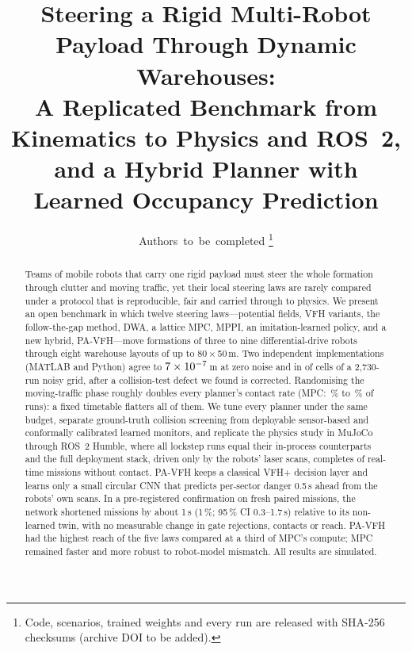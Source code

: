 \documentclass[journal]{IEEEtran}
\newcommand{\pavfh}{PA-VFH}
\begin{document}
\title{Steering a Rigid Multi-Robot Payload Through Dynamic Warehouses:\\
A Replicated Benchmark from Kinematics to Physics and ROS~2,\\
and a Hybrid Planner with Learned Occupancy Prediction}

\author{Authors~to~be~completed%
\thanks{Code, scenarios, trained weights and every run are released with
SHA-256 checksums (archive DOI to be added).}}


\maketitle

\begin{abstract}
Teams of mobile robots that carry one rigid payload must steer the whole
formation through clutter and moving traffic, yet their local steering laws
are rarely compared under a protocol that is reproducible, fair and carried
through to physics. We present an open benchmark in which twelve steering
laws---potential fields, VFH variants, the follow-the-gap method, DWA, a
lattice MPC, MPPI, an imitation-learned policy, and a new hybrid, \pavfh{}---move
formations of three to nine differential-drive robots through eight warehouse
layouts of up to 80\,$\times$\,50\,m. Two independent implementations
(MATLAB and Python) agree to $7\times10^{-7}$\,m at zero noise and in
\XsAgree{} of \XsCells{} cells of a 2{,}730-run noisy grid, after a
collision-test defect we found is corrected. Randomising the moving-traffic
phase roughly doubles every planner's contact rate (MPC: \MpcContactNom\,\% to
\MpcContactPhase\,\% of runs): a fixed timetable flatters all of them. We tune
every planner under the same budget, separate ground-truth collision screening
from deployable sensor-based and conformally calibrated learned monitors, and
replicate the physics study in MuJoCo through ROS~2 Humble, where all
\RoneN{} lockstep runs equal their in-process counterparts and the full
deployment stack, driven only by the robots' laser scans, completes
\RtwoClean{} of \RtwoN{} real-time missions without contact. \pavfh{} keeps a
classical VFH+ decision layer and learns only a small circular CNN that
predicts per-sector danger 0.5\,s ahead from the robots' own scans. In a
pre-registered confirmation on \EzeroN{} fresh paired missions, the network
shortened missions by about 1\,s (1\,\%; 95\,\% CI 0.3--1.7\,s) relative to its
non-learned twin, with no measurable change in gate rejections, contacts or
reach. \pavfh{} had the highest reach of the five laws compared at a third of
MPC's compute; MPC remained faster and more robust to robot-model mismatch.
All results are simulated.
\end{abstract}
\end{document}
